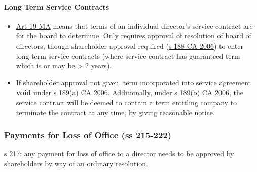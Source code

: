\documentclass[
]{article}
\providecommand{\tightlist}{%
  \setlength{\itemsep}{0pt}\setlength{\parskip}{0pt}}
\begin{document}
\hypertarget{long-term-service-contracts}{%
\paragraph{Long Term Service
Contracts}\label{long-term-service-contracts}}

\begin{itemize}
\tightlist
\item
  \href{https://www.gov.uk/government/publications/model-articles-for-private-companies-limited-by-shares/model-articles-for-private-companies-limited-by-shares\#remuneration}{Art
  19 MA} means that terms of an individual director's service contract
  are for the board to determine. Only requires approval of resolution
  of board of directors, though shareholder approval required
  (\href{https://www.legislation.gov.uk/ukpga/2006/46/section/188}{s 188
  CA 2006}) to enter long-term service contracts (where service contract
  has guaranteed term which is or may be \textgreater{} 2 years).
\item
  If shareholder approval not given, term incorporated into service
  agreement \textbf{void} under s 189(a) CA 2006. Additionally, under s
  189(b) CA 2006, the service contract will be deemed to contain a term
  entitling company to terminate the contract at any time, by giving
  reasonable notice.
\end{itemize}

\hypertarget{payments-for-loss-of-office-ss-215-222}{%
\subsubsection{Payments for Loss of Office (ss
215-222)}\label{payments-for-loss-of-office-ss-215-222}}

s 217: any payment for loss of office to a director needs to be approved
by shareholders by way of an ordinary resolution.
\end{document}
